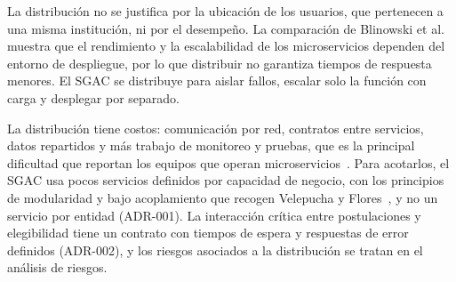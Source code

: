 La distribución no se justifica por la ubicación de los usuarios, que pertenecen a una misma institución, ni por el desempeño. La comparación de Blinowski et al.~\cite{blinowski2022monolithic} muestra que el rendimiento y la escalabilidad de los microservicios dependen del entorno de despliegue, por lo que distribuir no garantiza tiempos de respuesta menores. El SGAC se distribuye para aislar fallos, escalar solo la función con carga y desplegar por separado.

La distribución tiene costos: comunicación por red, contratos entre servicios, datos repartidos y más trabajo de monitoreo y pruebas, que es la principal dificultad que reportan los equipos que operan microservicios~\cite{waseem2021design}. Para acotarlos, el SGAC usa pocos servicios definidos por capacidad de negocio, con los principios de modularidad y bajo acoplamiento que recogen Velepucha y Flores~\cite{velepucha2023survey}, y no un servicio por entidad (ADR-001). La interacción crítica entre postulaciones y elegibilidad tiene un contrato con tiempos de espera y respuestas de error definidos (ADR-002), y los riesgos asociados a la distribución se tratan en el análisis de riesgos.
